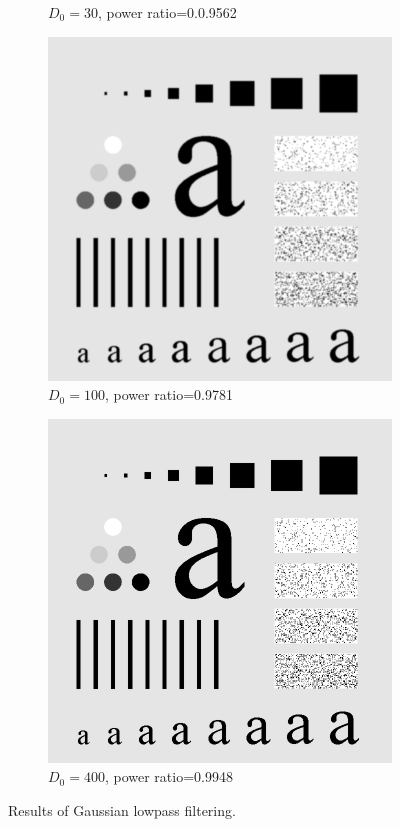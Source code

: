 \begin{figure}[h!]
\begin{subfigure}[b]{0.45\linewidth}
		\caption{$D_0=30$, power ratio=0.0.9562}
		\label{fig:GLPF_30}
	\end{subfigure}
  	\begin{subfigure}[b]{0.45\linewidth}
		\includegraphics[width=\linewidth]{myfigure/p3/GLPF_100.png}
		\caption{$D_0=100$, power ratio=0.9781}
		\label{fig:GLPF_100}
	\end{subfigure}
	\begin{subfigure}[b]{0.45\linewidth}
		\includegraphics[width=\linewidth]{myfigure/p3/GLPF_400.png}
		\caption{$D_0=400$, power ratio=0.9948}
		\label{fig:GLPF_400}
	\end{subfigure}
  	\caption{Results of Gaussian lowpass filtering.}
  	\label{fig:GLPF}
\end{figure}



